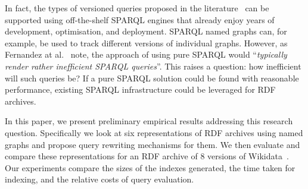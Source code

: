 \documentclass{llncs}
\begin{document}


In fact, the types of versioned queries proposed in the literature~\cite{FernandezPU15} can be supported using off-the-shelf SPARQL engines that already enjoy years of development, optimisation, and deployment. SPARQL named graphs can, for example, be used to track different versions of individual graphs. However, as Fernandez at al.~\cite{FernandezUPK19} note, the approach of using pure SPARQL would ``\textit{typically render rather inefficient SPARQL queries}''. This raises a question: how inefficient will such queries be? If a pure SPARQL solution could be found with reasonable performance, existing SPARQL infrastructure could be leveraged for RDF archives.

In this paper, we present preliminary empirical results addressing this research question. Specifically we look at six representations of RDF archives using named graphs and propose query rewriting mechanisms for them. We then evaluate and compare these representations for an RDF archive of 8 versions of Wikidata~\cite{VrandecicK14}. Our experiments compare the sizes of the indexes generated, the time taken for indexing, and the relative costs of query evaluation.

\end{document}
